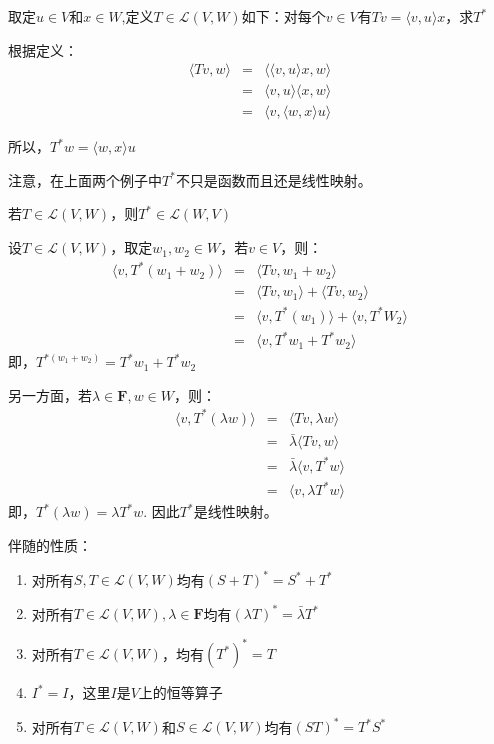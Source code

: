 \documentclass[10pt,a4paper,UTF8]{article}
\begin{document}
\begin{tikzinstance}
取定\(u\in V\)和\(x\in W\),定义\(T\in \mathcal{L}(V,W)\)如下：对每个\(v\in V\)有\(Tv = \langle v,u \rangle x\)，求\(T^{*}\)

根据定义：
\begin{eqnarray}
\label{eq:2}
 \langle Tv,w \rangle  &=& \langle  \langle v,u \rangle x , w\rangle  \\
&=& \langle v,u \rangle \langle x,w \rangle \\
&=& \langle v,\langle w,x \rangle u  \rangle
\end{eqnarray}

所以，\(T^{*}w = \langle w,x \rangle u\)
\end{tikzinstance}
注意，在上面两个例子中\(T^{*}\)不只是函数而且还是线性映射。
\begin{tikztheorem}
若\(T\in \mathcal{L}(V,W)\)，则\(T^{*}\in \mathcal{L}(W,V)\)
\end{tikztheorem}
\begin{tikzproof}
设\(T\in \mathcal{L}(V,W)\)，取定\(w_{1},w_{2}\in W\)，若\(v\in V\)，则：
\begin{eqnarray}
\label{eq:4}
 \langle v,T^{*}(w_{1} + w_{2}) \rangle  &=& \langle Tv,w_{1}+w_{2} \rangle  \\
&=& \langle Tv,w_{1} \rangle + \langle Tv,w_{2} \rangle \\
&=& \langle v,T^{*}(w_{1}) \rangle  + \langle v,T^{*}W_{2} \rangle  \\
&=& \langle v,T^{*}w_{1} + T^{*}w_{2} \rangle
\end{eqnarray}
即，\(T^{*(w_{1} + w_{2})} = T^{*}w_{1} + T^{*}w_{2}\)
\end{tikzproof}
另一方面，若\(\lambda\in \mathbf{F},w\in W\)，则：
\begin{eqnarray}
\label{eq:5}
\langle v,T^{*}(\lambda w) \rangle  &=& \langle Tv,\lambda w \rangle   \\
&=& \bar{\lambda} \langle Tv,w \rangle \\
&=& \bar{\lambda} \langle v,T^{*}w \rangle \\
&=& \langle v,\lambda T^{*}w \rangle
\end{eqnarray}
即，\(T^{*}(\lambda w) = \lambda T^{*} w\).
因此\(T^{*}\)是线性映射。

伴随的性质：
\begin{tikztheorem}
\begin{enumerate}
\item 对所有\(S,T\in \mathcal{L}(V,W)\)均有\((S+T)^{*} = S^{*} + T^{*}\)
\item 对所有\(T\in \mathcal{L}(V,W),\lambda\in \mathbf{F}\)均有\((\lambda T)^{*} = \bar{\lambda}T^{*}\)
\item 对所有\(T\in \mathcal{L}(V,W)\)，均有\((T^{*})^{*} = T\)
\item \(I^{*} = I\)，这里\(I\)是\(V\)上的恒等算子
\item 对所有\(T\in \mathcal{L}(V,W)\)和\(S\in \mathcal{L}(V,W)\)均有\((ST)^{*} = T^{*}S^{*}\)
\end{enumerate}
\end{tikztheorem}
\end{document}
